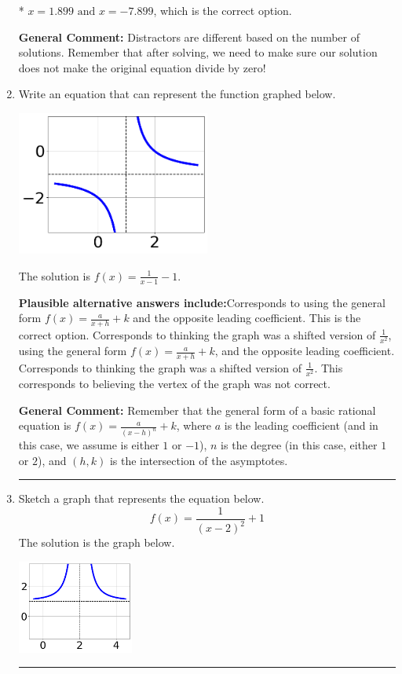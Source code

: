 \documentclass{extbook}[14pt]
\newcommand{\litem}[1]{\item #1

\rule{\textwidth}{0.4pt}}
\begin{document}
\begin{enumerate}
{\begin{enumerate}[label=\Alph*.]
* $x = 1.899 \text{ and } x = -7.899$, which is the correct option.


\end{enumerate}

\textbf{General Comment:} Distractors are different based on the number of solutions. Remember that after solving, we need to make sure our solution does not make the original equation divide by zero!
}
\litem{
Write an equation that can represent the function graphed below.

\begin{center}
    \includegraphics[width=0.5\textwidth]{../Figures/rationalGraphToEquationCopyA.png}
\end{center}


The solution is \( f(x) = \frac{1}{x - 1} - 1 \).\begin{enumerate}[label=\Alph*.]
\textbf{Plausible alternative answers include:}Corresponds to using the general form $f(x) = \frac{a}{x+h}+k$ and the opposite leading coefficient.
This is the correct option.
Corresponds to thinking the graph was a shifted version of $\frac{1}{x^2}$, using the general form $f(x) = \frac{a}{x+h}+k$, and the opposite leading coefficient.
Corresponds to thinking the graph was a shifted version of $\frac{1}{x^2}$.
This corresponds to believing the vertex of the graph was not correct.
\end{enumerate}

\textbf{General Comment:} Remember that the general form of a basic rational equation is $ f(x) = \frac{a}{(x-h)^n} + k$, where $a$ is the leading coefficient (and in this case, we assume is either $1$ or $-1$), $n$ is the degree (in this case, either $1$ or $2$), and $(h, k)$ is the intersection of the asymptotes.
}
\litem{
Sketch a graph that represents the equation below.
\[ f(x) = \frac{1}{(x - 2)^2} + 1 \]The solution is the graph below.
    \begin{center}
        \includegraphics[width=0.3\textwidth]{../Figures/rationalEquationToGraphCopyEA.png}
    \end{center}

}
\end{enumerate}
\end{document}
